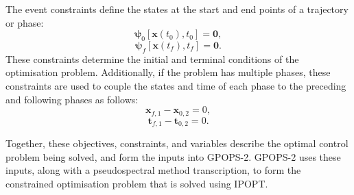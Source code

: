 \noindent The event constraints define the states at the start and end points of a trajectory or phase:
\begin{equation}
\mathbf{\psi}_0[\textbf{x}(t_{0}), t_{0}] = \textbf{0},
\end{equation}
\begin{equation} \label{eq:2}
\mathbf{\psi}_f[\textbf{x}(t_{f}), t_{f}] = \textbf{0}.
\end{equation}
These constraints determine the initial and terminal conditions of the optimisation problem. Additionally, if the problem has multiple phases, these constraints are used to couple the states and time of each phase to the preceding and following phases as follows:
\begin{equation}
\textbf{x}_{f,1} - \textbf{x}_{0,2} = 0,
\end{equation}
\begin{equation}
\textbf{t}_{f,1} - \textbf{t}_{0,2} = 0.
\end{equation}






Together, these objectives, constraints, and variables describe the optimal control problem being solved, and form the inputs into GPOPS-2. GPOPS-2 uses these inputs, along with a pseudospectral method transcription, to form the constrained optimisation problem that is solved using IPOPT.









